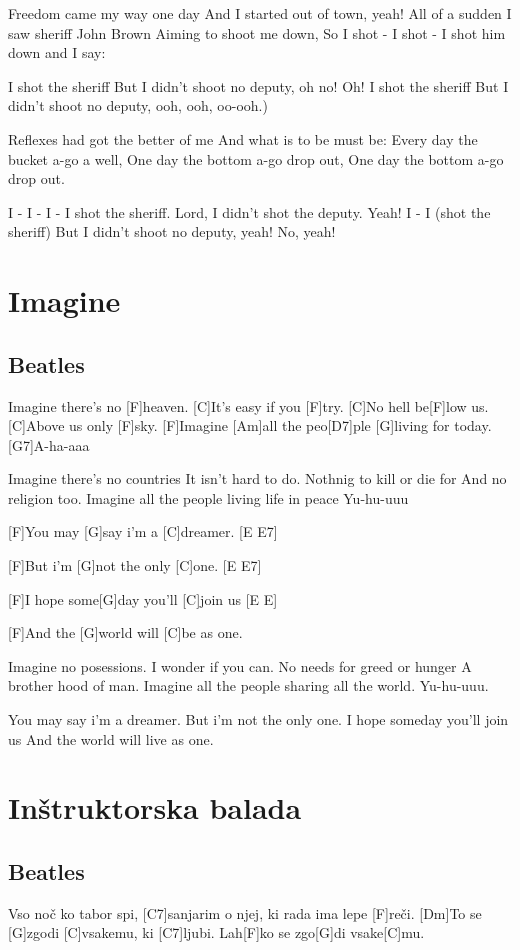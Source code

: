 \documentclass[a4paper,12pt]{article}
\begin{document}
\begin{multicols}{2}
\begin{guitar}
Freedom came my way one day
And I started out of town, yeah!
All of a sudden I saw sheriff John Brown
Aiming to shoot me down,
So I shot - I shot - I shot him down and I say:


I shot the sheriff
But I didn't shoot no deputy, oh no! Oh!
I shot the sheriff
But I didn't shoot no deputy, ooh, ooh, oo-ooh.)


Reflexes had got the better of me
And what is to be must be:
Every day the bucket a-go a well,
One day the bottom a-go drop out,
One day the bottom a-go drop out.


I - I - I - I shot the sheriff.
Lord, I didn't shot the deputy. Yeah!
I - I (shot the sheriff)
But I didn't shoot no deputy, yeah! No, yeah!

\end{guitar}
\section{Imagine}
\subsection*{Beatles}
\begin{guitar}
[C]Imagine there's no [F]heaven.
[C]It's easy if you [F]try.
[C]No hell be[F]low us.
[C]Above us only [F]sky.
[F]Imagine [Am]all the peo[D7]ple [G]living for today.
[G7]A-ha-aaa


Imagine there's no countries
It isn't hard to do.
Nothnig to kill or die for 
And no religion too.
Imagine all the people living  life in peace 
Yu-hu-uuu


[F]You may [G]say  i'm a [C]dreamer. [E E7]

[F]But i'm [G]not the only [C]one. [E  E7]

[F]I hope some[G]day you'll [C]join us [E  E]

[F]And the [G]world will [C]be as one.


Imagine no posessions.
I wonder if you can.
No needs for greed or hunger 
A brother hood of man.
Imagine all the people sharing all the world.
Yu-hu-uuu.


You may say  i'm a dreamer.
But i'm not the only one.
I hope someday you'll join us 
And the world will live as one.

\end{guitar}
\section{Inštruktorska balada}
\subsection*{Beatles}
\begin{guitar}
[C]Vso noč ko tabor spi, [C7]sanjarim o njej,
ki rada ima lepe [F]reči.
[Dm]To se [G]zgodi [C]vsakemu, ki [C7]ljubi.
Lah[F]ko se zgo[G]di vsake[C]mu.
 


\end{guitar}
\end{multicols}
\end{document}
